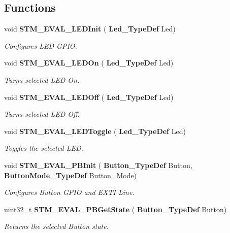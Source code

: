 \subsection*{Functions}
\begin{DoxyCompactItemize}
\item 
void \textbf{ S\+T\+M\+\_\+\+E\+V\+A\+L\+\_\+\+L\+E\+D\+Init} (\textbf{ Led\+\_\+\+Type\+Def} Led)
\begin{DoxyCompactList}\small\item\em Configures L\+ED G\+P\+IO. \end{DoxyCompactList}\item 
void \textbf{ S\+T\+M\+\_\+\+E\+V\+A\+L\+\_\+\+L\+E\+D\+On} (\textbf{ Led\+\_\+\+Type\+Def} Led)
\begin{DoxyCompactList}\small\item\em Turns selected L\+ED On. \end{DoxyCompactList}\item 
void \textbf{ S\+T\+M\+\_\+\+E\+V\+A\+L\+\_\+\+L\+E\+D\+Off} (\textbf{ Led\+\_\+\+Type\+Def} Led)
\begin{DoxyCompactList}\small\item\em Turns selected L\+ED Off. \end{DoxyCompactList}\item 
void \textbf{ S\+T\+M\+\_\+\+E\+V\+A\+L\+\_\+\+L\+E\+D\+Toggle} (\textbf{ Led\+\_\+\+Type\+Def} Led)
\begin{DoxyCompactList}\small\item\em Toggles the selected L\+ED. \end{DoxyCompactList}\item 
void \textbf{ S\+T\+M\+\_\+\+E\+V\+A\+L\+\_\+\+P\+B\+Init} (\textbf{ Button\+\_\+\+Type\+Def} Button, \textbf{ Button\+Mode\+\_\+\+Type\+Def} Button\+\_\+\+Mode)
\begin{DoxyCompactList}\small\item\em Configures Button G\+P\+IO and E\+X\+TI Line. \end{DoxyCompactList}\item 
uint32\+\_\+t \textbf{ S\+T\+M\+\_\+\+E\+V\+A\+L\+\_\+\+P\+B\+Get\+State} (\textbf{ Button\+\_\+\+Type\+Def} Button)
\begin{DoxyCompactList}\small\item\em Returns the selected Button state. \end{DoxyCompactList}\end{DoxyCompactItemize}
